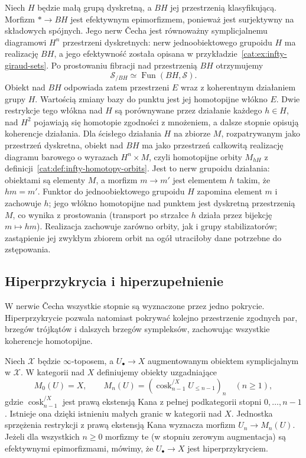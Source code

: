 \begin{przyklad}\label{cat:ex:infty-topos-descent-bg}
Niech $H$ będzie małą grupą dyskretną, a $BH$ jej przestrzenią klasyfikującą. Morfizm $*\to BH$ jest efektywnym epimorfizmem, ponieważ jest surjektywny na składowych spójnych. Jego nerw Čecha jest równoważny symplicjalnemu diagramowi $H^n$ przestrzeni dyskretnych: nerw jednoobiektowego grupoidu $H$ ma realizację $BH$, a jego efektywność została opisana w przykładzie~\ref{cat:ex:infty-giraud-sets}. Po prostowaniu fibracji nad przestrzenią $BH$ otrzymujemy
\[
 \mathcal S_{/BH}\simeq\operatorname{Fun}(BH,\mathcal S).
\]
Obiekt nad $BH$ odpowiada zatem przestrzeni $E$ wraz z koherentnym działaniem grupy $H$. Wartością zmiany bazy do punktu jest jej homotopijne włókno $E$. Dwie restrykcje tego włókna nad $H$ są porównywane przez działanie każdego $h\in H$, nad $H^2$ pojawiają się homotopie zgodności z mnożeniem, a dalsze stopnie opisują koherencje działania. Dla ścisłego działania $H$ na zbiorze $M$, rozpatrywanym jako przestrzeń dyskretna, obiekt nad $BH$ ma jako przestrzeń całkowitą realizację diagramu barowego o wyrazach $H^n\times M$, czyli homotopijne orbity $M_{hH}$ z definicji~\ref{cat:def:infty-homotopy-orbits}. Jest to nerw grupoidu działania: obiektami są elementy $M$, a morfizm $m\to m'$ jest elementem $h$ takim, że $hm=m'$. Funktor do jednoobiektowego grupoidu $H$ zapomina element $m$ i zachowuje $h$; jego włókno homotopijne nad punktem jest dyskretną przestrzenią $M$, co wynika z prostowania (transport po strzałce $h$ działa przez bijekcję $m\mapsto hm$). Realizacja zachowuje zarówno orbity, jak i grupy stabilizatorów; zastąpienie jej zwykłym zbiorem orbit na ogół utraciłoby dane potrzebne do zstępowania.
\end{przyklad}

\subsection{Hiperprzykrycia i hiperzupełnienie}

W nerwie Čecha wszystkie stopnie są wyznaczone przez jedno pokrycie. Hiperprzykrycie pozwala natomiast pokrywać kolejno przestrzenie zgodnych par, brzegów trójkątów i dalszych brzegów sympleksów, zachowując wszystkie koherencje homotopijne.

\begin{definicja}[Hiperprzykrycie]\label{cat:def:infty-topos-hypercover}
Niech $\mathcal X$ będzie $\infty$-toposem, a $U_\bullet\to X$ augmentowanym obiektem symplicjalnym w $\mathcal X$. W kategorii nad $X$ definiujemy obiekty uzgadniające
\[
 M_0(U)=X,\qquad
 M_n(U)=(\operatorname{cosk}_{n-1}^{/X} U_{\leq n-1})_n
 \quad(n\geq1),
\]
gdzie $\operatorname{cosk}_{n-1}^{/X}$ jest prawą ekstensją Kana z pełnej podkategorii stopni $0,\ldots,n-1$. Istnieje ona dzięki istnieniu małych granic w kategorii nad $X$. Jednostka sprzężenia restrykcji z prawą ekstensją Kana wyznacza morfizm $U_n\to M_n(U)$. Jeżeli dla wszystkich $n\geq0$ morfizmy te (w stopniu zerowym augmentacja) są efektywnymi epimorfizmami, mówimy, że $U_\bullet\to X$ jest hiperprzykryciem.
\end{definicja}

